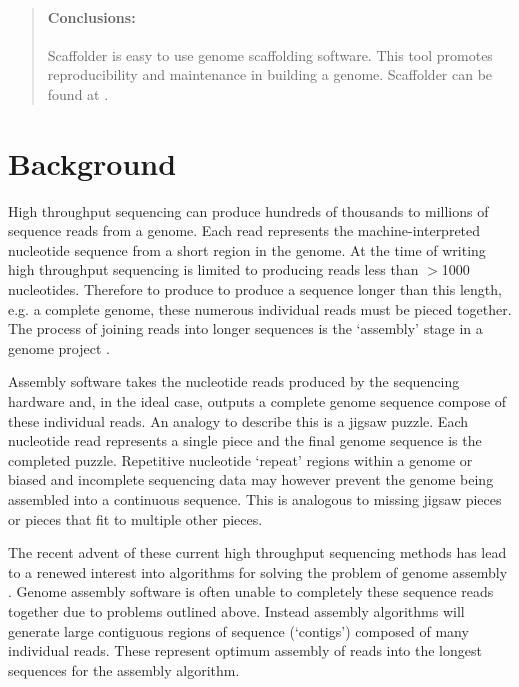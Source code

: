\documentclass[10pt]{bmc_article}
\newenvironment{bmcformat}{\begin{raggedright}\baselineskip20pt\sloppy\setboolean{publ}{false}}{\end{raggedright}\baselineskip20pt\sloppy}
\begin{document}
\begin{bmcformat}
\begin{abstract}
  \paragraph*{Conclusions:} Scaffolder is easy to use genome scaffolding
  software. This tool promotes reproducibility and maintenance in building
  a genome. Scaffolder can be found at \scaffolder.

\end{abstract}


\section*{Background} %

High throughput sequencing can produce hundreds of thousands to millions of
sequence reads from a genome. Each read represents the machine-interpreted
nucleotide sequence from a short region in the genome. At the time of writing
high throughput sequencing is limited to producing reads less than $>$1000
nucleotides. Therefore to produce to produce a sequence longer than this
length, e.g. a complete genome, these numerous individual reads must be pieced
together. The process of joining reads into longer sequences is the `assembly'
stage in a genome project \cite{assembly-reviews}. \pb

Assembly software takes the nucleotide reads produced by the sequencing
hardware and, in the ideal case, outputs a complete genome sequence compose of
these individual reads. An analogy to describe this is a jigsaw puzzle. Each
nucleotide read represents a single piece and the final genome sequence is the
completed puzzle. Repetitive nucleotide `repeat' regions within a genome or
biased and incomplete sequencing data may however prevent the genome being
assembled into a continuous sequence. This is analogous to missing jigsaw
pieces or pieces that fit to multiple other pieces. \pb

The recent advent of these current high throughput sequencing methods has lead
to a renewed interest into algorithms for solving the problem of genome
assembly \cite{assembly-reviews}. Genome assembly software is often unable to
completely these sequence reads together due to problems outlined above.
Instead assembly algorithms will generate large contiguous regions of sequence
(`contigs') composed of many individual reads. These represent optimum assembly
of reads into the longest sequences for the assembly algorithm. \pb


\end{bmcformat}
\end{document}
